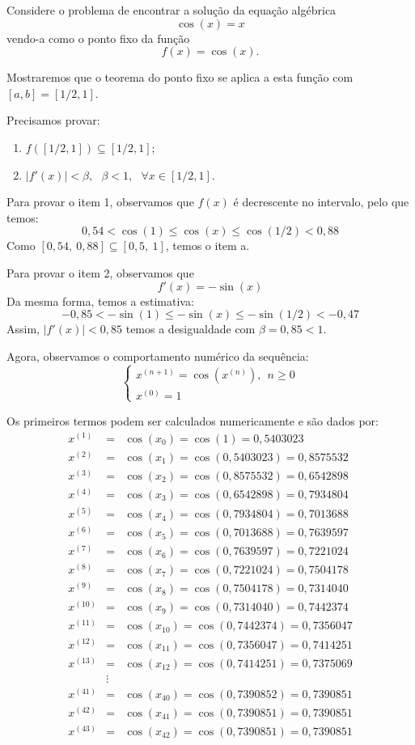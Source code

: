 \begin{ex}
Considere o problema de encontrar a solução da equação algébrica
$$\cos(x)=x$$
vendo-a como o ponto fixo da função
$$f(x)=\cos(x).$$

Mostraremos que o teorema do ponto fixo se aplica a esta função com $[a,b]=[1/2,1]$.

Precisamos provar:
\begin{enumerate}
\item $f\left([1/2,1]\right) \subseteq [1/2,1]$;
\item $|f'(x)|<\beta,~~~\beta<1,~~~ \forall x\in [1/2,1]$.
\end{enumerate}

Para provar o item 1, observamos que $f(x)$ é decrescente no intervalo, pelo que temos:
$$0,54<\cos(1)\leq \cos(x)\leq \cos(1/2)<0,88$$
Como $[0,54,~0,88]\subseteq [0,5,~1]$, temos o item a.

Para provar o item 2, observamos que
$$f'(x)=-\sin(x)$$
Da mesma forma, temos a estimativa:
$$-0,85<-\sin(1) \leq -\sin(x)\leq -\sin(1/2)<-0,47$$
Assim, $|f'(x)|<0,85$ temos a desigualdade com $\beta=0,85<1$.

Agora, observamos o comportamento numérico da sequência:
$$\left\{\begin{array}{ll}x^{(n+1)}=\cos(x^{(n)}),~~ n\geq 0\\
x^{(0)}=1
\end{array}\right.$$


Os primeiros termos podem ser calculados numericamente e são dados por:
\begin{eqnarray*}
x^{(1)}&=&\cos(x_0)=\cos(1)=0,5403023\\
x^{(2)}&=&\cos(x_1)=\cos(0,5403023)=0,8575532\\
x^{(3)}&=&\cos(x_2)=\cos(0,8575532)=0,6542898\\
x^{(4)}&=&\cos(x_3)=\cos(0,6542898)=0,7934804\\
x^{(5)}&=&\cos(x_4)=\cos(0,7934804)=0,7013688\\
x^{(6)}&=&\cos(x_5)=\cos(0,7013688)=0,7639597\\
x^{(7)}&=&\cos(x_6)=\cos(0,7639597)=0,7221024\\
x^{(8)}&=&\cos(x_7)=\cos(0,7221024)=0,7504178\\
x^{(9)}&=&\cos(x_8)=\cos(0,7504178)=0,7314040\\
x^{(10)}&=&\cos(x_9)=\cos(0,7314040)= 0,7442374  \\
x^{(11)}&=&\cos(x_{10})=\cos(0,7442374)=0,7356047  \\
x^{(12)}&=&\cos(x_{11})=\cos(0,7356047)=0,7414251  \\
x^{(13)}&=&\cos(x_{12})=\cos(0,7414251)=0,7375069  \\
&\vdots&\\
x^{(41)}&=&\cos(x_{40})=\cos(0,7390852)= 0,7390851  \\
x^{(42)}&=&\cos(x_{41})=\cos(0,7390851)= 0,7390851   \\
x^{(43)}&=&\cos(x_{42})=\cos(0,7390851 )= 0,7390851
\end{eqnarray*}
\end{ex}


